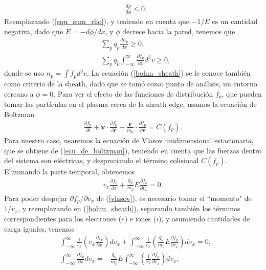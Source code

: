 \documentclass[../main.tex]{subfiles}
\begin{document}
{    \begin{align}
        &\frac{d\rho}{d\phi} \leq 0.
    \end{align}
    Reemplazando (\ref{equ_sum_rho}), y teniendo en cuenta que $-1/E$ es un cantidad negativa, dado que $E = - d\phi/dx$, y  $\phi$ decrece hacia la pared, tenemos que
    \begin{align}
        &\sum_p q_p \frac{dn_p}{dx} \geq 0, \\
        &\sum_p q_p \int_{-\infty}^{\infty}\frac{\partial f_p}{\partial x}d^3v \geq 0, \label{bohm_sheath}
    \end{align}
    donde se uso $n_p = \int f_p d^3v$. La ecuación (\ref{bohm_sheath}) se le conoce también como criterio de la sheath, dado que se tomó como punto de análisis, un entorno cercano a $\phi=0$. Para ver el efecto de las funciones de distribución $f_p$, que pueden tomar las partículas en el plasma cerca de la sheath edge, usamos la
    ecuación de Boltzman 
    \begin{align}
        \frac{\partial f_p}{\partial t} + \mathbf{v}\cdot\frac{\partial f_p}{\partial \mathbf{r}} +\frac{\mathbf{F}}{m_p} \cdot\frac{\partial f_p}{\partial \mathbf{v}} = C\left(f_p\right). \label{ecu_de_boltzman}
    \end{align}
    Para nuestro caso, usaremos la ecuación de Vlasov unidimensional estacionaria, que se obtiene de (\ref{ecu_de_boltzman}), teniendo en cuenta que las fuerzas dentro del sistema son eléctricas, y despreciando el término colisional $C\left(f_p\right)$. Eliminando la parte temporal, obtenemos
    \begin{align}
        v_x\frac{\partial f_p}{\partial x} + \frac{q_p}{m_p}E\frac{\partial f_p}{\partial v_x} = 0. \label{vlasov}
    \end{align}
    Para poder despejar $\partial f_p/\partial v_x$ de (\ref{vlasov}), es necesario tomar el ``momento" de $1/v_x$, y reemplazando en (\ref{bohm_sheath}), separando también los términos correspondientes para los electrones ($e$) e iones ($i$), y asumiendo cantidades de carga iguales, tenemos
    \begin{align}
        &\int^{\infty}_{-\infty}\frac{1}{v_x}\left(v_x\frac{\partial f_p}{\partial x}\right)dv_x + \int^{\infty}_{-\infty}\frac{1}{v_x}\left(\frac{q_p}{m_p}E\frac{\partial f_p}{\partial v_x}\right)dv_x = 0, \\
        &\int^{\infty}_{-\infty}\frac{\partial f_p}{\partial x}dv_x  = - \frac{q_p}{m_p}E\int^{\infty}_{-\infty}\left(\frac{1}{v_x}\frac{\partial f_p}{\partial v_x}\right)dv_x, \\

\end{align}}
\end{document}
